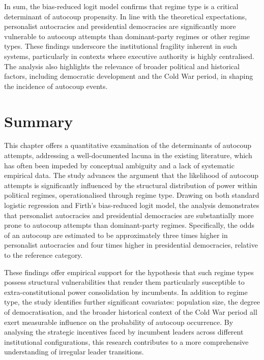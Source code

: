 \documentclass[
  12pt,
]{report}
\begin{document}
In sum, the bias-reduced logit model confirms that regime type is a
critical determinant of autocoup propensity. In line with the
theoretical expectations, personalist autocracies and presidential
democracies are significantly more vulnerable to autocoup attempts than
dominant-party regimes or other regime types. These findings underscore
the institutional fragility inherent in such systems, particularly in
contexts where executive authority is highly centralised. The analysis
also highlights the relevance of broader political and historical
factors, including democratic development and the Cold War period, in
shaping the incidence of autocoup events.

\section{Summary}\label{summary-1}

This chapter offers a quantitative examination of the determinants of
autocoup attempts, addressing a well-documented lacuna in the existing
literature, which has often been impeded by conceptual ambiguity and a
lack of systematic empirical data. The study advances the argument that
the likelihood of autocoup attempts is significantly influenced by the
structural distribution of power within political regimes,
operationalised through regime type. Drawing on both standard logistic
regression and Firth's bias-reduced logit model, the analysis
demonstrates that personalist autocracies and presidential democracies
are substantially more prone to autocoup attempts than dominant-party
regimes. Specifically, the odds of an autocoup are estimated to be
approximately three times higher in personalist autocracies and four
times higher in presidential democracies, relative to the reference
category.

These findings offer empirical support for the hypothesis that such
regime types possess structural vulnerabilities that render them
particularly susceptible to extra-constitutional power consolidation by
incumbents. In addition to regime type, the study identifies further
significant covariates: population size, the degree of democratisation,
and the broader historical context of the Cold War period all exert
measurable influence on the probability of autocoup occurrence. By
analysing the strategic incentives faced by incumbent leaders across
different institutional configurations, this research contributes to a
more comprehensive understanding of irregular leader transitions.
\end{document}
